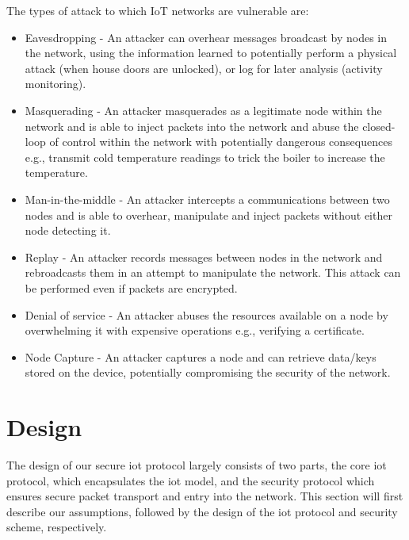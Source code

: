 \documentclass[conference]{./sty/IEEEtran}
\begin{document}
The types of attack to which IoT networks are vulnerable are:
\begin{itemize}
  \item Eavesdropping - An attacker can overhear messages broadcast by nodes in the network, using the information learned to potentially perform a physical attack (when house doors are unlocked), or log for later analysis (activity monitoring).  
  \item Masquerading - An attacker masquerades as a legitimate node within the network and is able to inject packets into the network and abuse the closed-loop of control within the network with potentially dangerous consequences e.g., transmit cold temperature readings to trick the boiler to increase the temperature.
  \item Man-in-the-middle - An attacker intercepts a communications between two nodes and is able to overhear, manipulate and inject packets without either node detecting it. 
  \item Replay - An attacker records messages between nodes in the network and rebroadcasts them in an attempt to manipulate the network. This attack can be performed even if packets are encrypted. 
  \item Denial of service - An attacker abuses the resources available on a node by overwhelming it with expensive operations e.g., verifying a certificate.
  \item Node Capture - An attacker captures a node and can retrieve data/keys stored on the device, potentially compromising the security of the network.
\end{itemize}


\section{Design} %
\label{sec:design}
The design of our secure iot protocol largely consists of two parts, the core iot protocol, which encapsulates the iot model, and the security protocol which ensures secure packet transport and entry into the network. This section will first describe our assumptions, followed by the design of the iot protocol and security scheme, respectively.
\end{document}
